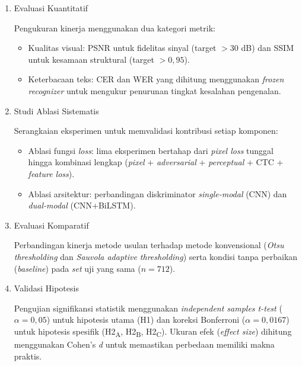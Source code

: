 \begin{enumerate}[label=\arabic*., leftmargin=1.5em, labelsep=0.5em, itemindent=0pt, noitemsep, topsep=0pt]
    \item Evaluasi Kuantitatif

    Pengukuran kinerja menggunakan dua kategori metrik:
    \begin{itemize}[nosep, leftmargin=1.5em]
        \item Kualitas visual: PSNR untuk fidelitas sinyal (target $>30$ dB) dan SSIM untuk kesamaan struktural (target $>0{,}95$).
        \item Keterbacaan teks: CER dan WER yang dihitung menggunakan \textit{frozen recognizer} untuk mengukur penurunan tingkat kesalahan pengenalan.
    \end{itemize}

    \item Studi Ablasi Sistematis
    
    Serangkaian eksperimen untuk memvalidasi kontribusi setiap komponen:
    \begin{itemize}[nosep, leftmargin=1.5em]
        \item Ablasi fungsi \textit{loss}: lima eksperimen bertahap dari \textit{pixel loss} tunggal hingga kombinasi lengkap (\textit{pixel} + \textit{adversarial} + \textit{perceptual} + CTC + \textit{feature loss}).
        \item Ablasi arsitektur: perbandingan diskriminator \textit{single-modal} (CNN) dan \textit{dual-modal} (CNN+BiLSTM).
    \end{itemize}

    \item Evaluasi Komparatif
    
    Perbandingan kinerja metode usulan terhadap metode konvensional (\textit{Otsu thresholding} dan \textit{Sauvola adaptive thresholding}) serta kondisi tanpa perbaikan (\textit{baseline}) pada \textit{set} uji yang sama ($n=712$).

    \item Validasi Hipotesis
    
    Pengujian signifikansi statistik menggunakan \textit{independent samples t-test} ($\alpha=0{,}05$) untuk hipotesis utama (H1) dan koreksi Bonferroni ($\alpha=0{,}0167$) untuk hipotesis spesifik (H2\textsubscript{A}, H2\textsubscript{B}, H2\textsubscript{C}). Ukuran efek (\textit{effect size}) dihitung menggunakan Cohen's \textit{d} untuk memastikan perbedaan memiliki makna praktis.
\end{enumerate}

